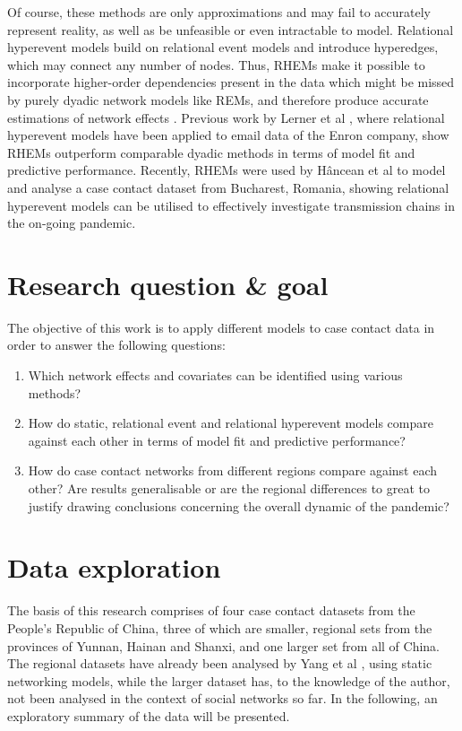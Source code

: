 \documentclass{article}
\begin{document}
	Of course, these methods are only approximations and may fail to accurately represent reality, as well as be unfeasible or even intractable to model. Relational hyperevent models build on relational event models and introduce hyperedges, which may connect any number of nodes. Thus, RHEMs make it possible to incorporate higher-order dependencies present in the data which might be missed by purely dyadic network models like REMs, and therefore produce accurate estimations of network effects \cite{lerner2019rem}. Previous work by Lerner et al \cite{lerner2021relational}, where relational hyperevent models have been applied to email data of the Enron company, show RHEMs outperform comparable dyadic methods in terms of model fit and predictive performance. Recently, RHEMs were used by Hâncean et al \cite{hancean2022occupations} to model and analyse a case contact dataset from Bucharest, Romania, showing relational hyperevent models can be utilised to effectively investigate transmission chains in the on-going pandemic.
	\section{Research question \& goal}
	\label{sec:Research_questions}
	The objective of this work is to apply different models to case contact data in order to answer the following questions:
	\begin{enumerate}
		\item Which network effects and covariates can be identified using various methods?
		\item How do static, relational event and relational hyperevent models compare against each other in terms of model fit and predictive performance?
		\item How do case contact networks from different regions compare against each other? Are results generalisable or are the regional differences to great to justify drawing conclusions concerning the overall dynamic of the pandemic?
	\end{enumerate}
	
	\section{Data exploration}
	\label{sec:Data_exploration}
	The basis of this research comprises of four case contact datasets from the People's Republic of China, three of which are smaller, regional sets from the provinces of Yunnan, Hainan and Shanxi, and one larger set from all of China. The regional datasets have already been analysed by Yang et al \cite{hainan_publication},\cite{shanxi_publication} using static networking models, while the larger dataset has, to the knowledge of the author, not been analysed in the context of social networks so far. In the following, an exploratory summary of the data will be presented.
	
\end{document}
